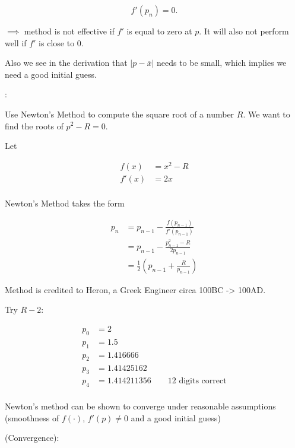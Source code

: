 \[
f'(p_n) = 0
.\]
 
$\implies$ method is not effective if $f'$ is equal to zero at $p$. It will
also not perform well if $f'$ is close to $0$.

Also we see in the derivation that $|p- \overline{x}|$ needs to be small,
which implies we need a good initial guess.

\ex:

Use Newton's Method to compute the square root of a number $R$. We want to find
the roots of $p^2 - R = 0$. 

Let

\begin{align*}
  f(x) &= x^2 - R \\
  f'(x) &= 2x \\
\end{align*}

Newton's Method takes the form

\begin{align*}
p_n &= p_{n-1} - \frac{f(p_{n-1})}{f'(p_{n-1})} \\
    &= p_{n-1} - \frac{p_{n-1}^2 - R}{2p_{n-1}} \\
    &= \frac{1}{2}(p_{n-1} + \frac{R}{p_{n-1}})
\end{align*}

Method is credited to Heron, a Greek Engineer circa 100BC -> 100AD.

Try $R-2$: 

\begin{align*}
p_0 &= 2 \\
p_1 &= 1.5 \\
p_2 &= 1.416666 \\
p_3 &= 1.41425162 \\
p_4 &= 1.414211356 \qquad \text{12 digits correct}  \\
\end{align*}

Newton's method can be shown to converge under reasonable assumptions
(smoothness of $f(\cdot)$, $f'(p)\neq 0$ and a good initial guess)

\thm (Convergence):

